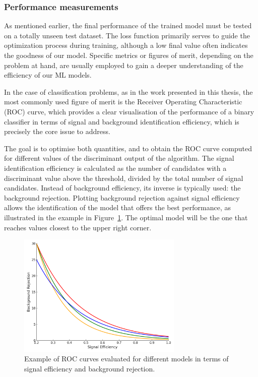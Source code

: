 \subsubsection*{Performance measurements}
As mentioned earlier, the final performance of the trained model must be tested on a totally unseen test dataset. The loss function primarily serves to guide the optimization process during training, although a low final value often indicates the goodness of our model. Specific metrics or figures of merit, depending on the problem at hand, are usually employed to gain a deeper understanding of the efficiency of our ML models.

In the case of classification problems, as in the work presented in this thesis, the most commonly used figure of merit is the Receiver Operating Characteristic (ROC) curve, which provides a clear visualisation of the performance of a binary classifier in terms of signal and background identification efficiency, which is precisely the core issue to address.

The goal is to optimise both quantities, and to obtain the ROC curve computed for different values of the discriminant output of the algorithm. The signal identification efficiency is calculated as the number of candidates with a discriminant value above the threshold, divided by the total number of signal candidates. Instead of background efficiency, its inverse is typically used: the background rejection. Plotting background rejection against signal efficiency allows the identification of the model that offers the best performance, as illustrated in the example in Figure~\ref{fig:roc_curves}. The optimal model will be the one that reaches values closest to the upper right corner.

\begin{figure}[htbp]
    \centering
    \includegraphics[width=0.7\textwidth]{images/roc_curves_clean.png}
    \caption{Example of ROC curves evaluated for different models in terms of signal efficiency and background rejection.}
    \label{fig:roc_curves}
  \end{figure}

